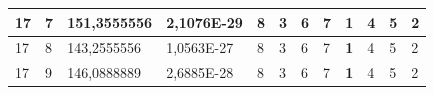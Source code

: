 \documentclass[conference]{IEEEtran}
\begin{document}
\begin{table}[]
\begin{tabular}{|llll|llllllll|}
\multicolumn{1}{|l|}{17}                                                             & \multicolumn{1}{l|}{7}                                                                 & \multicolumn{1}{l|}{151,3555556}                                                           & 2,1076E-29                              & \multicolumn{1}{l|}{8}                                                           & \multicolumn{1}{l|}{3}                                                           & \multicolumn{1}{l|}{6}                                                           & \multicolumn{1}{l|}{7}                                                           & \multicolumn{1}{l|}{\textbf{1}}                                                  & \multicolumn{1}{l|}{4}                                                           & \multicolumn{1}{l|}{5}                                                           & 2                                   \\ \hline
\multicolumn{1}{|l|}{17}                                                             & \multicolumn{1}{l|}{8}                                                                 & \multicolumn{1}{l|}{143,2555556}                                                           & 1,0563E-27                              & \multicolumn{1}{l|}{8}                                                           & \multicolumn{1}{l|}{3}                                                           & \multicolumn{1}{l|}{6}                                                           & \multicolumn{1}{l|}{7}                                                           & \multicolumn{1}{l|}{\textbf{1}}                                                  & \multicolumn{1}{l|}{4}                                                           & \multicolumn{1}{l|}{5}                                                           & 2                                   \\ \hline
\multicolumn{1}{|l|}{17}                                                             & \multicolumn{1}{l|}{9}                                                                 & \multicolumn{1}{l|}{146,0888889}                                                           & 2,6885E-28                              & \multicolumn{1}{l|}{8}                                                           & \multicolumn{1}{l|}{3}                                                           & \multicolumn{1}{l|}{6}                                                           & \multicolumn{1}{l|}{7}                                                           & \multicolumn{1}{l|}{\textbf{1}}                                                  & \multicolumn{1}{l|}{4}                                                           & \multicolumn{1}{l|}{5}                                                           & 2                                   \\ \hline

\end{tabular}
\end{table}
\end{document}
